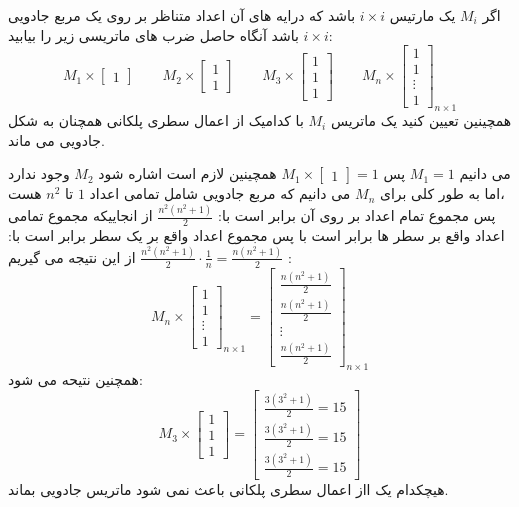 \documentclass{article}
\begin{document}
اگر 
$M_i$
یک مارتیس 
$i\times i$
باشد که درایه های آن اعداد متناظر بر روی یک مربع جادویی 
$i\times i$
باشد آنگاه حاصل ضرب های ماتریسی زیر را بیابید:
$$M_1 \times
\begin{bmatrix}
1
\end{bmatrix}
\qquad M_2 \times
\begin{bmatrix}
1\\
1
\end{bmatrix}
\qquad M_3 \times
\begin{bmatrix}
1\\
1\\
1
\end{bmatrix}
\qquad M_n \times
\begin{bmatrix}
	1\\
	1\\
	\vdots\\
	1
\end{bmatrix}_{n\times1}
$$
همچینین تعیین کنید یک ماتریس 
$M_i$
با کدامیک از اعمال سطری پلکانی همچنان به شکل جادویی می ماند.
\begin{حل}
	می دانیم 
	$M_1=1$
	پس 
	$M_1 \times
	\begin{bmatrix}
	1
	\end{bmatrix}
	=1$
	 همچینین لازم است اشاره شود 
	 $M_2$
	 وجود ندارد ،اما به طور کلی برای 
	 $M_n$ 
	 می دانیم که مربع جادویی شامل تمامی اعداد 
	 $1$
	 تا 
	 $n^2$
	 هست پس مجموع تمام اعداد بر روی آن برابر است با:
	 $\frac{n^2(n^2+1)}{2}$ 
	 از انجاییکه مجموع تمامی اعداد واقع بر سطر ها برابر است با پس مجموع اعداد واقع بر یک سطر برابر است با:
	 $\frac{n^2(n^2+1)}{2}\cdot \frac{1}{n}=\frac{n(n^2+1)}{2}$
	 از این نتیجه می گیریم :
	 $$M_n\times\begin{bmatrix}
	 1\\
	 1\\
	 \vdots\\
	 1
	 \end{bmatrix}_{n\times1}=\begin{bmatrix}
	 \frac{n(n^2+1)}{2}\\
	 \frac{n(n^2+1)}{2}\\
	 \vdots\\
	 \frac{n(n^2+1)}{2}
	 \end{bmatrix}_{n\times1}$$
	 همچنین نتیحه می شود:
	 $$M_3\times\begin{bmatrix}
	 1\\
	 1\\
	
	 1
	 \end{bmatrix}=\begin{bmatrix}
	 \frac{3(3^2+1)}{2}=15\\
	 \frac{3(3^2+1)}{2}=15\\
	 \frac{3(3^2+1)}{2}=15
	 \end{bmatrix}$$
	 هیچکدام یک ااز اعمال سطری پلکانی باعث نمی شود ماتریس جادویی بماند.
\end{حل}
\end{document}
